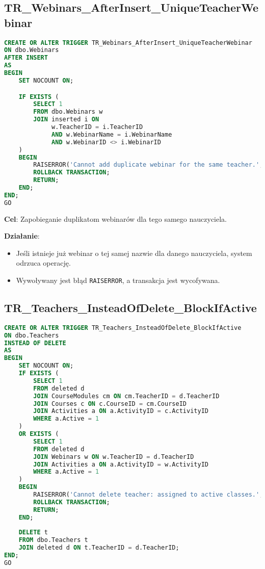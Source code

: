 \documentclass[12pt]{article}
\begin{document}
\vspace{1em}

\newpage

\subsection{TR\_Webinars\_AfterInsert\_UniqueTeacherWebinar}
\begin{lstlisting}[language=SQL]
CREATE OR ALTER TRIGGER TR_Webinars_AfterInsert_UniqueTeacherWebinar
ON dbo.Webinars
AFTER INSERT
AS
BEGIN
    SET NOCOUNT ON;

    IF EXISTS (
        SELECT 1
        FROM dbo.Webinars w
        JOIN inserted i ON
             w.TeacherID = i.TeacherID
             AND w.WebinarName = i.WebinarName
             AND w.WebinarID <> i.WebinarID
    )
    BEGIN
        RAISERROR('Cannot add duplicate webinar for the same teacher.', 16, 1);
        ROLLBACK TRANSACTION;
        RETURN;
    END;
END;
GO
\end{lstlisting}

\noindent \textbf{Cel}: Zapobieganie duplikatom webinarów dla tego samego nauczyciela.

\noindent \textbf{Działanie}:  
\begin{itemize}
    \item Jeśli istnieje już webinar o tej samej nazwie dla danego nauczyciela, system odrzuca operację.
    \item Wywoływany jest błąd \texttt{RAISERROR}, a transakcja jest wycofywana.
\end{itemize}


\newpage
\subsection{TR\_Teachers\_InsteadOfDelete\_BlockIfActive}

\begin{lstlisting}[language=SQL]
CREATE OR ALTER TRIGGER TR_Teachers_InsteadOfDelete_BlockIfActive
ON dbo.Teachers
INSTEAD OF DELETE
AS
BEGIN
    SET NOCOUNT ON;
    IF EXISTS (
        SELECT 1
        FROM deleted d
        JOIN CourseModules cm ON cm.TeacherID = d.TeacherID
        JOIN Courses c ON c.CourseID = cm.CourseID
        JOIN Activities a ON a.ActivityID = c.ActivityID
        WHERE a.Active = 1
    )
    OR EXISTS (
        SELECT 1
        FROM deleted d
        JOIN Webinars w ON w.TeacherID = d.TeacherID
        JOIN Activities a ON a.ActivityID = w.ActivityID
        WHERE a.Active = 1
    )
    BEGIN
        RAISERROR('Cannot delete teacher: assigned to active classes.', 16, 1);
        ROLLBACK TRANSACTION;
        RETURN;
    END;
    
    DELETE t
    FROM dbo.Teachers t
    JOIN deleted d ON t.TeacherID = d.TeacherID;
END;
GO
\end{lstlisting}
\end{document}
